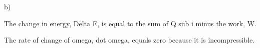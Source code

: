 b)

The change in energy, Delta E, is equal to the sum of Q sub i minus the work, W.

The rate of change of omega, dot omega, equals zero because it is incompressible.